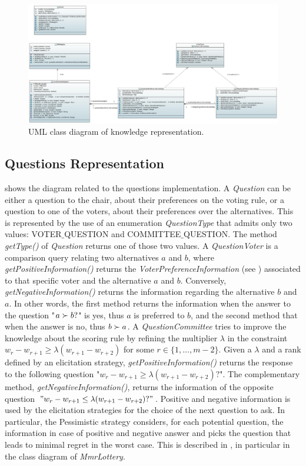 \begin{figure}
	\centering
	\includegraphics[width=\textwidth]{uml/knowledge.jpeg}
	\caption{UML class diagram of knowledge representation.}
	\label{uml:knowledge}
\end{figure}

\subsection{Questions Representation}

 shows the diagram related to the questions implementation. A \textit{Question} can be either a question to the chair, about their preferences on the voting rule, or a question to one of the voters, about their preferences over the alternatives. This is represented by the use of an enumeration \textit{QuestionType} that admits only two values: VOTER$\_$QUESTION and COMMITTEE$\_\allowbreak$QUESTION.
The method \textit{getType()} of \textit{Question} returns one of those two values.
A \textit{QuestionVoter} is a comparison query relating two alternatives $a$ and $b$, where \textit{getPositiveInformation()} returns the \textit{VoterPreferenceInformation} (see ) associated to that specific voter and the alternative $a$ and $b$. Conversely, \textit{getNegativeInformation()} returns the information regarding the alternative $b$ and $a$. In other words, the first method returns the information when the answer to the question "$a\succ b ?$" is yes, thus $a$ is preferred to $b$, and the second method that when the answer is no, thus $b\succ a$.
A \textit{QuestionCommittee} tries to improve the knowledge about the scoring rule by refining the multiplier $\lambda$ in the constraint $w_{r} - w_{r+1} \geq \lambda (w_{r+1} - w_{r+2})$ for some $r \in \{1,\ldots,m-2\}$. Given a $\lambda$ and a rank defined by an elicitation strategy, \textit{getPositiveInformation()} returns the response to the following question "$w_{r} - w_{r+1} \geq \lambda (w_{r+1} - w_{r+2})?$". The complementary method, \textit{getNegativeInformation()}, returns the information of the opposite question $"w_{r} - w_{r+1} \leq \lambda (w_{r+1} - w_{r+2})?"$.
Positive and negative information is used by the elicitation strategies for the choice of the next question to ask. In particular, the Pessimistic strategy considers, for each potential question, the information in case of positive and negative answer and picks the question that leads to minimal regret in the worst case. This is described in , in particular in the class diagram of \textit{MmrLottery}.


